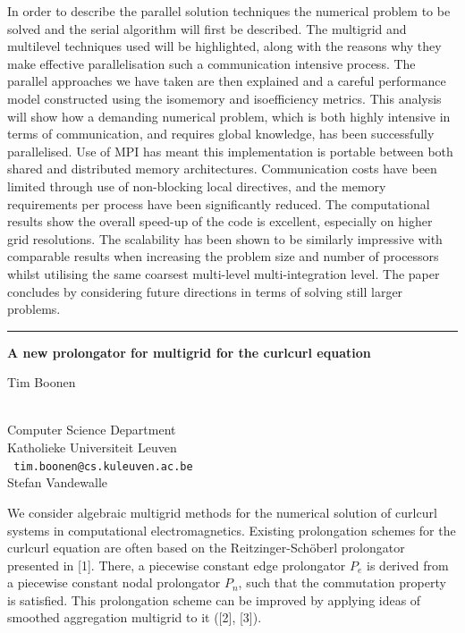 \documentclass[twosided]{report}
\begin{document}
In order to describe the parallel solution techniques the numerical
problem to be solved and the serial algorithm will first be described.
The multigrid and multilevel techniques used will be highlighted, along
with the reasons why they make effective parallelisation such a
communication intensive process.  The parallel approaches we have taken
are then explained and a careful performance model constructed using
the isomemory and isoefficiency metrics.  This analysis  will show how
a demanding numerical problem, which is both highly intensive in terms
of communication, and requires global knowledge, has been successfully
parallelised.  Use of MPI has meant this implementation is portable
between both shared and distributed memory architectures.
Communication costs have been limited through use of non-blocking local
directives, and the memory requirements per process have been
significantly reduced.  The computational results show the overall
speed-up of the code is excellent, especially on higher grid
resolutions.  The scalability has been shown to be similarly impressive
with comparable results when increasing the problem size and number of
processors whilst utilising the same coarsest multi-level
multi-integration level.  The paper concludes by considering future
directions in terms of solving still larger problems.



\begin{center}

\rule{6in}{1pt}
\end{center}

\begin{center}
{\large			\label{boonen}
{\bf
A new prolongator for multigrid for the curlcurl equation
}

Tim Boonen} \\
Computer Science Department
\\
Katholieke Universiteit Leuven
\\ {\tt
tim.boonen@cs.kuleuven.ac.be
}
\\
Stefan Vandewalle
\end{center}

We consider algebraic multigrid methods for the numerical solution of
curlcurl systems in computational electromagnetics. Existing
prolongation schemes for the curlcurl equation are often based on the
Reitzinger-Sch\"{o}berl prolongator presented in [1]. There, a
piecewise constant edge prolongator $P_e$ is derived from a piecewise
constant nodal prolongator $P_n$, such that the commutation property is
satisfied. This prolongation scheme can be improved by applying ideas
of smoothed aggregation multigrid to it ([2], [3]).
\end{document}
